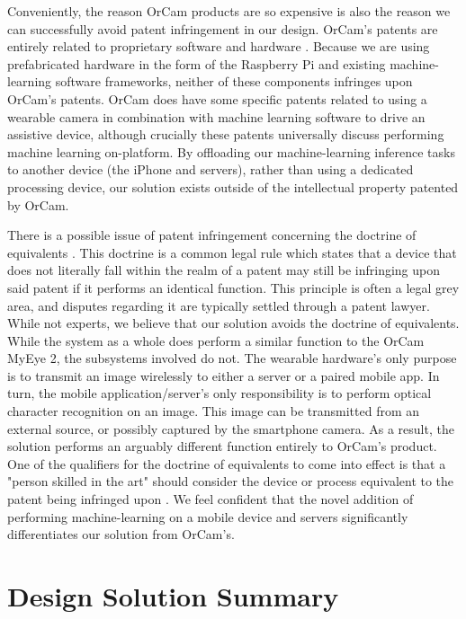 \documentclass[a4paper,11pt]{article}
\begin{document}
Conveniently, the reason OrCam products are so expensive is also the reason we can successfully avoid patent infringement in our design. OrCam's patents are entirely related to proprietary software \cite{orcam-software} and hardware \cite{orcam-hardware}. Because we are using prefabricated hardware in the form of the Raspberry Pi and existing machine-learning software frameworks, neither of these components infringes upon OrCam's patents. OrCam does have some specific patents related to using a wearable camera in combination with machine learning software to drive an assistive device, although crucially these patents universally discuss performing machine learning on-platform. By offloading our machine-learning inference tasks to another device (the iPhone and servers), rather than using a dedicated processing device, our solution exists outside of the intellectual property patented by OrCam.

There is a possible issue of patent infringement concerning the doctrine of equivalents \cite{doctrine-of-equivalents}. This doctrine is a common legal rule which states that a device that does not literally fall within the realm of a patent may still be infringing upon said patent if it performs an identical function. This principle is often a legal grey area, and disputes regarding it are typically settled through a patent lawyer. While not experts, we believe that our solution avoids the doctrine of equivalents. While the system as a whole does perform a similar function to the OrCam MyEye 2, the subsystems involved do not. The wearable hardware's only purpose is to transmit an image wirelessly to either a server or a paired mobile app. In turn, the mobile application/server's only responsibility is to perform optical character recognition on an image. This image can be transmitted from an external source, or possibly captured by the smartphone camera. As a result, the solution performs an arguably different function entirely to OrCam's product. One of the qualifiers for the doctrine of equivalents to come into effect is that a "person skilled in the art" should consider the device or process equivalent to the patent being infringed upon \cite{doctrine-of-equivalents}. We feel confident that the novel addition of performing machine-learning on a mobile device and servers significantly differentiates our solution from OrCam's.


\newpage
\section{Design Solution Summary}
\end{document}
